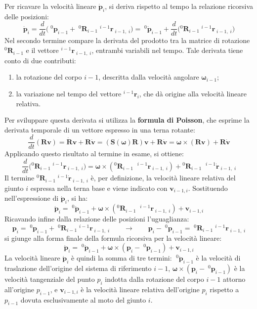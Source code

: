 \documentclass[11pt, a4paper]{report}
\begin{document}
Per ricavare la velocità lineare \(\dot{\bm{p}}_i\), si deriva rispetto al tempo la relazione ricorsiva delle posizioni:
\[
    \dot{\bm{p}}_i = \frac{d}{dt} \biggl( \;^{0}\bm{p}_{i-1} + \;^{0}\bm{R}_{i-1} \;^{i-1}{\bm{r}}_{\; i-1, \; i} \biggr) = \;^{0}\dot{\bm{p}}_{i-1} + \frac{d}{dt} \biggl( {}^{0}\bm{R}_{i-1} \;^{i-1}{\bm{r}}_{\; i-1, \; i} \biggr)
\]
Nel secondo termine compare la derivata del prodotto tra la matrice di rotazione \({}^{0}\bm{R}_{i-1}\) e il vettore \({}^{i-1}{\bm{r}}_{\; i-1, \; i}\), entrambi variabili nel tempo. Tale derivata tiene conto di due contributi:
\begin{enumerate}
    \item la rotazione del corpo \(i-1\), descritta dalla velocità angolare \(\bm{\omega}_{i-1}\);
    \item la variazione nel tempo del vettore \(^{i-1}{\bm{r}}_i\), che dà origine alla velocità lineare relativa.
\end{enumerate}
Per sviluppare questa derivata si utilizza la \textbf{formula di Poisson}, che esprime la derivata temporale di un vettore espresso in una terna rotante:
\[
    \frac{d}{dt}(\bm{R}\bm{v}) = \dot{\bm{R}}\bm{v} + \bm{R}\dot{\bm{v}} = (\bm{S}(\bm{\omega})\bm{R})\bm{v} + \bm{R}\dot{\bm{v}} = \bm{\omega} \times (\bm{R}\bm{v}) + \bm{R}\dot{\bm{v}}
\]
Applicando questo risultato al termine in esame, si ottiene:
\[
    \frac{d}{dt} \biggl( {}^{0}\bm{R}_{i-1} \;{}^{i-1}{\bm{r}}_{\; i-1, \; i} \biggr) = \bm{\omega} \times ({}^{0}\bm{R}_{i-1} \; \;{}^{i-1}{\bm{r}}_{\; i-1, \; i}) + {}^{0}\bm{R}_{i-1} \; \;{}^{i-1}{\dot{\bm{r}}}_{\; i-1, \; i}
\]
Il termine \({}^{0}\bm{R}_{i-1} \;{}^{i-1}{\dot{\bm{r}}}_{\; i-1, \; i}\) è, per definizione, la velocità lineare relativa del giunto \(i\) espressa nella terna base e viene indicato con \(\bm{v}_{i-1,i}\). Sostituendo nell'espressione di \(\dot{\bm{p}}_i\), si ha:
\[
    \dot{\bm{p}}_i = \;^{0}\dot{\bm{p}}_{i-1} + \bm{\omega} \times ({}^{0}\bm{R}_{i-1} \; \;{}^{i-1}{\bm{r}}_{\; i-1, \; i}) + \bm{v}_{i-1,i}
\]
Ricavando infine dalla relazione delle posizioni l'uguaglianza:
\[
    \bm{p}_i = \;^{0}\bm{p}_{i-1} + \;^{0}\bm{R}_{i-1} \;^{i-1}{\bm{r}}_{\; i-1, \; i} \qquad \longrightarrow \qquad \bm{p}_i - \;^{0}\bm{p}_{i-1} = \;^{0}\bm{R}_{i-1} \;^{i-1}{\bm{r}}_{\; i-1, \; i}
\]
si giunge alla forma finale della formula ricorsiva per la velocità lineare:
\[
    \dot{\bm{p}}_i = \;^{0}\dot{\bm{p}}_{i-1} + \bm{\omega} \times (\bm{p}_i - \;^{0}\bm{p}_{i-1}) + \bm{v}_{i-1,i}
\]
La velocità lineare \(\dot{\bm{p}}_i\) è quindi la somma di tre termini: \(\;^{0}\dot{\bm{p}}_{i-1}\) è la velocità di traslazione dell'origine del sistema di riferimento \(i-1\), \(\bm{\omega} \times (\bm{p}_i - \;^{0}\bm{p}_{i-1})\) è la velocità tangenziale del punto \(p_i\) indotta dalla rotazione del corpo \(i-1\) attorno all'origine \(p_{i-1}\), e \(\bm{v}_{i-1,i}\) è la velocità lineare relativa dell'origine \(p_i\) rispetto a \(p_{i-1}\) dovuta esclusivamente al moto del giunto \(i\).
\end{document}
